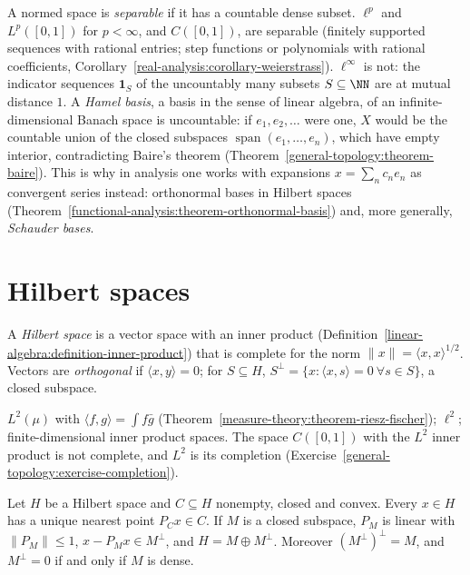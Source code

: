 \begin{remark}\label{functional-analysis:remark-separable-bases}
A normed space is \emph{separable} if it has a countable dense subset. $\ell^p$ and $L^p([0, 1])$ for $p < \infty$, and $C([0, 1])$, are separable (finitely supported sequences with rational entries;
step functions or polynomials with rational coefficients, Corollary~\ref{real-analysis:corollary-weierstrass}). $\ell^\infty$ is not: the indicator sequences $\mathbf{1}_S$ of the uncountably many
subsets $S \subseteq \NN$ are at mutual distance $1$. A \emph{Hamel basis}, a basis in the sense of linear algebra, of an infinite-dimensional Banach space is uncountable: if $e_1, e_2, \ldots$ were one,
$X$ would be the countable union of the closed subspaces $\operatorname{span}(e_1, \ldots, e_n)$, which have empty interior, contradicting Baire's theorem
(Theorem~\ref{general-topology:theorem-baire}). This is why in analysis one works with expansions $x = \sum_n c_ne_n$ as convergent series instead: orthonormal bases in Hilbert spaces
(Theorem~\ref{functional-analysis:theorem-orthonormal-basis}) and, more generally, \emph{Schauder bases}.
\end{remark}

\section{Hilbert spaces}\label{functional-analysis:section-hilbert}

\begin{definition}\label{functional-analysis:definition-hilbert}
A \emph{Hilbert space} is a vector space with an inner product (Definition~\ref{linear-algebra:definition-inner-product}) that is complete for the norm $\|x\| = \langle x, x \rangle^{1/2}$. Vectors are
\emph{orthogonal} if $\langle x, y \rangle = 0$; for $S \subseteq H$, $S^\perp = \{x : \langle x, s \rangle = 0 \ \forall s \in S\}$, a closed subspace.
\end{definition}

\begin{example}\label{functional-analysis:example-hilbert}
$L^2(\mu)$ with $\langle f, g \rangle = \int f\bar g$ (Theorem~\ref{measure-theory:theorem-riesz-fischer}); $\ell^2$; finite-dimensional inner product spaces. The space $C([0,1])$ with the $L^2$ inner product is
not complete, and $L^2$ is its completion (Exercise~\ref{general-topology:exercise-completion}).
\end{example}

\begin{theorem}\label{functional-analysis:theorem-projection}
Let $H$ be a Hilbert space and $C \subseteq H$ nonempty, closed and convex. Every $x \in H$ has a unique nearest point $P_Cx \in C$. If $M$ is a closed subspace, $P_M$ is linear with $\|P_M\| \leq 1$,
$x - P_Mx \in M^\perp$, and $H = M \oplus M^\perp$. Moreover $(M^\perp)^\perp = M$, and $M^\perp = 0$ if and only if $M$ is dense.
\end{theorem}

